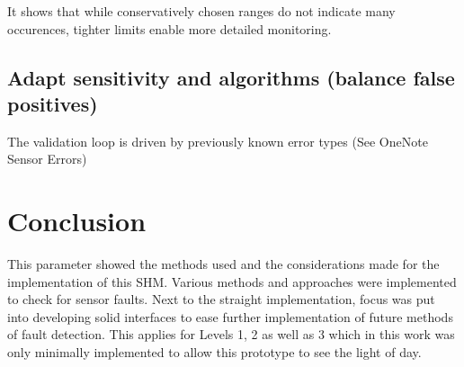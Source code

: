 It shows that while conservatively chosen ranges do not indicate many occurences, tighter limits enable more detailed monitoring.

\subsection{Adapt sensitivity and algorithms (balance false positives)}

The validation loop is driven by previously known error types (See OneNote Sensor Errors)


\section{Conclusion}

This parameter showed the methods used and the considerations made for the implementation of this SHM. Various methods and approaches were implemented to check for sensor faults. Next to the straight implementation, focus was put into developing solid interfaces to ease further implementation of future methods of fault detection. This applies for Levels 1, 2 as well as 3 which in this work was only minimally implemented to allow this prototype to see the light of day.





